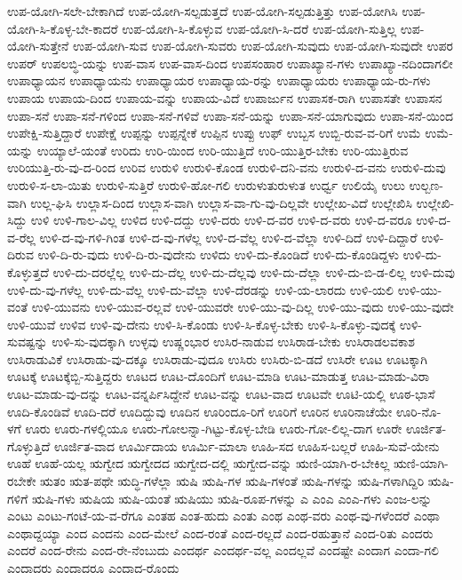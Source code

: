 {ಉಪ-ಯೋಗಿ-ಸಲೇ-ಬೇಕಾಗಿದೆ
ಉಪ-ಯೋಗಿ-ಸಲ್ಪಡುತ್ತದೆ
ಉಪ-ಯೋಗಿ-ಸಲ್ಪಡುತ್ತಿತ್ತು
ಉಪ-ಯೋಗಿಸಿ
ಉಪ-ಯೋಗಿ-ಸಿ-ಕೊಳ್ಳ-ಬೇ-ಕಾದರೆ
ಉಪ-ಯೋಗಿ-ಸಿ-ಕೊಳ್ಳುವ
ಉಪ-ಯೋಗಿ-ಸಿ-ದರೆ
ಉಪ-ಯೋಗಿ-ಸುತ್ತಿಲ್ಲ
ಉಪ-ಯೋಗಿ-ಸುತ್ತೇನೆ
ಉಪ-ಯೋಗಿ-ಸುವ
ಉಪ-ಯೋಗಿ-ಸುವರು
ಉಪ-ಯೋಗಿ-ಸುವುದು
ಉಪ-ಯೋಗಿ-ಸುವುದೇ
ಉಪರ
ಉಪರ್
ಉಪಲಬ್ಧಿ-ಯನ್ನು
ಉಪ-ವಾಸ
ಉಪ-ವಾಸ-ದಿಂದ
ಉಪಸಂಹಾರ
ಉಪಾಖ್ಯಾನ-ಗಳು
ಉಪಾಖ್ಯಾ-ನದಿಂದಾಗಲೀ
ಉಪಾಧ್ಯಾಯನ
ಉಪಾಧ್ಯಾಯನು
ಉಪಾಧ್ಯಾಯರ
ಉಪಾಧ್ಯಾಯ-ರನ್ನು
ಉಪಾಧ್ಯಾಯರು
ಉಪಾಧ್ಯಾಯ-ರು-ಗಳು
ಉಪಾಯ
ಉಪಾಯ-ದಿಂದ
ಉಪಾಯ-ವನ್ನು
ಉಪಾಯ-ವಿದೆ
ಉಪಾರ್ಜುನ
ಉಪಾಸಕ-ರಾಗಿ
ಉಪಾಸತೇ
ಉಪಾಸನ
ಉಪಾ-ಸನೆ
ಉಪಾ-ಸನೆ-ಗಳಿಂದ
ಉಪಾ-ಸನೆ-ಗಳಿವೆ
ಉಪಾ-ಸನೆ-ಯನ್ನು
ಉಪಾ-ಸನೆ-ಯಾಗುವುದು
ಉಪಾ-ಸನೆ-ಯಿಂದ
ಉಪೇಕ್ಷಿ-ಸುತ್ತಿದ್ದಾರೆ
ಉಪೇಕ್ಷೆ
ಉಪ್ಪನ್ನು
ಉಪ್ಪನ್ನೇಕೆ
ಉಪ್ಪಿನ
ಉಪ್ಪು
ಉಫ್
ಉಬ್ಬಸ
ಉಬ್ಬಿ-ರುವ-ವ-ರಿಗೆ
ಉಮೆ
ಉಮೆ-ಯನ್ನು
ಉಯ್ಯಾಲೆ-ಯಂತೆ
ಉರಿದು
ಉರಿ-ಯಿಂದ
ಉರಿ-ಯುತ್ತಿದೆ
ಉರಿ-ಯುತ್ತಿರ-ಬೇಕು
ಉರಿ-ಯುತ್ತಿರುವ
ಉರಿಯುತ್ತಿ-ರು-ವು-ದ-ರಿಂದ
ಉರಿವ
ಉರುಳಿ
ಉರುಳಿ-ಕೊಂಡ
ಉರುಳಿ-ದನಿ-ವನು
ಉರುಳಿ-ದ-ವನು
ಉರುಳಿ-ದುವು
ಉರುಳಿ-ಸ-ಲಾ-ಯಿತು
ಉರುಳಿ-ಸುತ್ತಿರೆ
ಉರುಳಿ-ಹೋ-ಗಲಿ
ಉರುಳುತುರುಳುತ
ಉರ್ಧ್ವ
ಉಲಿಯೈ
ಉಲು
ಉಲ್ಬಣ-ವಾಗಿ
ಉಲ್ಲ-ಘಿಸಿ
ಉಲ್ಲಾಸ-ದಿಂದ
ಉಲ್ಲಾಸ-ವಾಗಿ
ಉಲ್ಲಾಸ-ವಾ-ಗು-ವು-ದಿಲ್ಲವೇ
ಉಲ್ಲೇಖ-ವಿದೆ
ಉಲ್ಲೇಖಿಸಿ
ಉಲ್ಲೇಖಿ-ಸಿದ್ದು
ಉಳಿ
ಉಳಿ-ಗಾಲ-ವಿಲ್ಲ
ಉಳಿದ
ಉಳಿ-ದದ್ದು
ಉಳಿ-ದರು
ಉಳಿ-ದ-ವರ
ಉಳಿ-ದ-ವರು
ಉಳಿ-ದ-ವರೂ
ಉಳಿ-ದ-ವ-ರೆಲ್ಲ
ಉಳಿ-ದ-ವು-ಗಳಿ-ಗಿಂತ
ಉಳಿ-ದ-ವು-ಗಳೆಲ್ಲ
ಉಳಿ-ದ-ವೆಲ್ಲ
ಉಳಿ-ದ-ವೆಲ್ಲಾ
ಉಳಿ-ದಿದೆ
ಉಳಿ-ದಿದ್ದಾರೆ
ಉಳಿ-ದಿರುವ
ಉಳಿ-ದಿ-ರು-ವುದು
ಉಳಿ-ದಿ-ರು-ವುದೇನು
ಉಳಿದು
ಉಳಿ-ದು-ಕೊಂಡಿದೆ
ಉಳಿ-ದು-ಕೊಂಡಿದ್ದಳು
ಉಳಿ-ದು-ಕೊಳ್ಳುತ್ತದೆ
ಉಳಿ-ದು-ದರಲ್ಲೆಲ್ಲ
ಉಳಿ-ದು-ದೆಲ್ಲ
ಉಳಿ-ದು-ದೆಲ್ಲವು
ಉಳಿ-ದು-ದೆಲ್ಲಾ
ಉಳಿ-ದು-ಬಿ-ಡ-ಲಿಲ್ಲ
ಉಳಿ-ದುವು
ಉಳಿ-ದು-ವು-ಗಳೆಲ್ಲ
ಉಳಿ-ದು-ವೆಲ್ಲ
ಉಳಿ-ದು-ವೆಲ್ಲಾ
ಉಳಿ-ದೆರಡನ್ನು
ಉಳಿ-ಯ-ಲಾರದು
ಉಳಿ-ಯಲಿ
ಉಳಿ-ಯು-ವಂತೆ
ಉಳಿ-ಯುವನು
ಉಳಿ-ಯುವ-ರಲ್ಲವೆ
ಉಳಿ-ಯುವರೇ
ಉಳಿ-ಯು-ವು-ದಿಲ್ಲ
ಉಳಿ-ಯು-ವುದು
ಉಳಿ-ಯು-ವುದೇ
ಉಳಿ-ಯುವೆ
ಉಳಿವ
ಉಳಿ-ವು-ದೇನು
ಉಳಿ-ಸಿ-ಕೊಂಡು
ಉಳಿ-ಸಿ-ಕೊಳ್ಳ-ಬೇಕು
ಉಳಿ-ಸಿ-ಕೊಳ್ಳು-ವುದಕ್ಕೆ
ಉಳಿ-ಸುವಷ್ಟನ್ನು
ಉಳಿ-ಸು-ವುದಕ್ಕಾಗಿ
ಉಳ್ಳವು
ಉಷ್ಣಂಭಾರ
ಉಸಿರ-ನಾಡುವ
ಉಸಿರಾಡ-ಬೇಕು
ಉಸಿರಾಡಲವಕಾಶ
ಉಸಿರಾಡುವಿಕೆ
ಉಸಿರಾಡು-ವು-ದಕ್ಕೂ
ಉಸಿರಾಡು-ವುದೂ
ಉಸಿರು
ಉಸಿರು-ಬಿ-ಡದೆ
ಉಸಿರೇ
ಊಟ
ಊಟಕ್ಕಾಗಿ
ಊಟಕ್ಕೆ
ಊಟಕ್ಕೆಬ್ಬಿ-ಸುತ್ತಿದ್ದರು
ಊಟದ
ಊಟ-ದೊಂದಿಗೆ
ಊಟ-ಮಾಡಿ
ಊಟ-ಮಾಡುತ್ತ
ಊಟ-ಮಾಡು-ವಿರಾ
ಊಟ-ಮಾಡು-ವು-ದನ್ನು
ಊಟ-ವನ್ನರ್ಪಿಸಿದ್ದೇನೆ
ಊಟ-ವನ್ನು
ಊಟ-ವಾದ
ಊಟವೇ
ಊಟಿ-ಯಲ್ಲಿ
ಊಠ-ಭಾಸೆ
ಊದಿ-ಕೊಂಡಿವೆ
ಊದಿ-ದರೆ
ಊದಿದ್ದುವು
ಊದಿನ
ಊರಿಂದೂ-ರಿಗೆ
ಊರಿಗೆ
ಊರಿನ
ಊರಿನಾಚೆಯೇ
ಊರಿ-ನೊ-ಳಗೆ
ಊರು
ಊರು-ಗಳಲ್ಲಿಯೂ
ಊರು-ಗೋಲನ್ನಾ-ಗಿಟ್ಟು-ಕೊಳ್ಳ-ಬೇಡಿ
ಊರು-ಗೋ-ಲಿಲ್ಲ-ದಾಗ
ಊರೇ
ಊರ್ಜಿತ-ಗೊಳ್ಳುತ್ತಿದೆ
ಊರ್ಜಿತ-ವಾದ
ಊರ್ಮಿದಾಯ
ಊರ್ಮಿ-ಮಾಲಾ
ಊಹಿ-ಸದ
ಊಹಿಸ-ಬಲ್ಲರೆ
ಊಹಿ-ಸುವೆ-ಯೇನು
ಊಹೆ
ಊಹೆ-ಯಲ್ಲ
ಋಗ್ವೇದ
ಋಗ್ವೇದದ
ಋಗ್ವೇದ-ದಲ್ಲಿ
ಋಗ್ವೇದ-ವನ್ನು
ಋಣಿ-ಯಾಗಿ-ರ-ಬೇಕಿಲ್ಲ
ಋಣಿ-ಯಾಗಿ-ರಬೇಕೇ
ಋತಂ
ಋತ-ಪಥೇ
ಋದ್ಧಿ-ಗಳೆಲ್ಲಾ
ಋಷಿ
ಋಷಿ-ಗಳ
ಋಷಿ-ಗಳಂತೆ
ಋಷಿ-ಗಳನ್ನು
ಋಷಿ-ಗಳಾಗಿದ್ದಿರಿ
ಋಷಿ-ಗಳಿಗೆ
ಋಷಿ-ಗಳು
ಋಷಿಯ
ಋಷಿ-ಯಂತೆ
ಋಷಿಯು
ಋಷಿ-ರೂಪ-ಗಳನ್ನು
ಎ
ಎಂಎ
ಎಂಎ-ಗಳು
ಎಂಜ-ಲನ್ನು
ಎಂಟು
ಎಂಟು-ಗಂಟೆ-ಯ-ವ-ರೆಗೂ
ಎಂತಹ
ಎಂತ-ಹುದು
ಎಂತು
ಎಂಥ
ಎಂಥ-ವರು
ಎಂಥ-ವು-ಗಳೆಂದರೆ
ಎಂಥಾ
ಎಂಥಾದ್ದಯ್ಯಾ
ಎಂದ
ಎಂದನು
ಎಂದ-ಮೇಲೆ
ಎಂದ-ರಂತೆ
ಎಂದ-ರಲ್ಲದೆ
ಎಂದ-ರಹುತ್ತಾನೆ
ಎಂದ-ರಿತು
ಎಂದರು
ಎಂದರೆ
ಎಂದ-ರೇನು
ಎಂದ-ರೇ-ನೆಂಬುದು
ಎಂದರ್ಥ
ಎಂದರ್ಥ-ವಲ್ಲ
ಎಂದಲ್ಲವೆ
ಎಂದಷ್ಟೇ
ಎಂದಾಗ
ಎಂದಾ-ಗಲಿ
ಎಂದಾದರು
ಎಂದಾದರೂ
ಎಂದಾದ-ರೊಂದು
}
